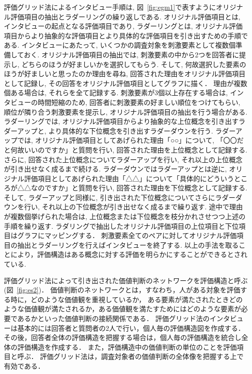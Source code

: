 \documentclass[syuuron]{kuee}
\begin{document}
		評価グリッド法によるインタビュー手順は, 図~\ref{fig:egm1}で表すようにオリジナル評価項目の抽出とラダーリングの繰り返しである. 
		オリジナル評価項目とは, インタビューの起点となる評価項目であり, 
		ラダーリングとは, オリジナル評価項目からより抽象的な評価項目とより具体的な評価項目を引き出すための手順である. 
		インタビューにあたって, いくつかの調査対象を刺激要素として複数個準備しておく. 
		オリジナル評価項目の抽出では, 刺激要素の中から2つを回答者に提示し, どちらのほうが好ましいかを選択してもらう. 
		そして, 何故選択した要素のほうが好ましいと思ったのか理由を尋ね, 回答された理由をオリジナル評価項目として記録し, その回答をオリジナル評価項目としてグラフに描く．
		理由が複数個ある場合は, それらを全て記録する. 
		刺激要素が3個以上存在する場合は, インタビューの時間短縮のため, 回答者に刺激要素の好ましい順位をつけてもらい, 順位が隣り合う刺激要素を提示し, 
		オリジナル評価項目の抽出を行う場合がある. 
		ラダーリングでは, オリジナル評価項目からより抽象的な上位概念を引き出すラダーアップと, より具体的な下位概念を引き出すラダーダウンを行う. 
		ラダーアップでは, オリジナル評価項目としてあげられた理由「○○」について, 「〇〇だと何故いいのですか」と質問を行い, 回答された理由を上位概念として記録する. 
		さらに, 回答された上位概念についてラダーアップを行い, それ以上の上位概念が引き出せなく成るまで続ける. 
		ラダーダウンではラダーアップとは逆に, オリジナル評価項目としてあげられた理由「△△」について「具体的にどういうところが△△なのですか」と質問を行い, 
		回答された理由を下位概念として記録する. 
		そして, ラダーアップと同様に, 引き出された下位概念についてさらにラダーダウンを行い, それ以上の下位概念が引き出せなく成るまで繰り返す. 
		途中で理由が複数個挙げられた場合は, 上位概念または下位概念を枝分かれさせつつ上述の手順を繰り返す. 
		ラダリングで抽出したオリジナル評価項目の上位項目と下位項目はグラフにマッピングする．
		刺激要素全てのペアに対してオリジナル評価項目の抽出とラダーリングを行えばインタビューを終了する. 
		以上の手法を取ることにより，評価構造はある概念に対する評価を明らかにすることができるとされている. 
		
		評価グリッド法によって引き出された価値判断のネットワークを評価構造と呼ぶ(図~\ref{fig:es2})．
		価値判断のネットワークとは，すなわち，人がある対象を評価する時に，どのような価値観を重視しているか，
		ある要素が満たされたときどのような価値観が満たされるか，ある価値観を満たすためにはどのような要素が必要であるかといった価値判断の接続関係である．
		評価グリッド法のインタビューは基本的には回答者と質問者の2人で行い，個人毎の評価構造図を作成する．
		その後，回答者全体の評価構造を把握する場合は，個人毎の評価構造を統合し全体の評価構造を作成する．
		また，評価構造中の価値判断の単位のことを評価項目と呼ぶ．
		評価グリッド法は，調査対象者の価値判断の全体像を把握する上で有効である．
		
\end{document}
